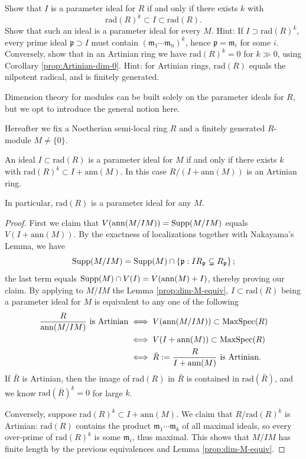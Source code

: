 \begin{exercise}
	Show that $I$ is a parameter ideal for $R$ if and only if there exists $k$ with
	\[ \text{rad}(R)^k \subset I \subset \text{rad}(R). \]
	Show that such an ideal is a parameter ideal for every $M$. Hint: If $I \supset \text{rad}(R)^k$, every prime ideal $\mathfrak{p} \supset I$ must contain $(\mathfrak{m}_1 \cdots \mathfrak{m}_n)^k$, hence $\mathfrak{p} = \mathfrak{m}_i$ for some $i$. Conversely, show that in an Artinian ring we have $\text{rad}(R)^k = 0$ for $k \gg 0$, using Corollary \ref{prop:Artinian-dim-0}. Hint: for Artinian rings, $\text{rad}(R)$ equals the nilpotent radical, and is finitely generated.
\end{exercise}

Dimension theory for modules can be built solely on the parameter ideals for $R$, but we opt to introduce the general notion here.

Hereafter we fix a Noetherian semi-local ring $R$ and a finitely generated $R$-module $M \neq \{0\}$.

\begin{lemma}\label{prop:para-ideal-characterization}
	An ideal $I \subset \text{rad}(R)$ is a parameter ideal for $M$ if and only if there exists $k$ with $\text{rad}(R)^k \subset I + \text{ann}(M)$. In this case $R/(I+\text{ann}(M))$ is an Artinian ring.
	
	In particular, $\text{rad}(R)$ is a parameter ideal for any $M$.
\end{lemma}
\begin{proof}
	First we claim that $V(\text{ann}(M/IM)) = \operatorname{Supp}(M/IM)$ equals $V(I+\text{ann}(M))$. By the exactness of localizations together with Nakayama's Lemma, we have
	\[ \operatorname{Supp}(M/IM) = \operatorname{Supp}(M) \cap \left\{ \mathfrak{p}: IR_{\mathfrak{p}} \subsetneq R_{\mathfrak{p}} \right\}; \]
	the last term equals $\operatorname{Supp}(M) \cap V(I) = V(\text{ann}(M)+I)$, thereby proving our claim. By applying to $M/IM$ the Lemma \ref{prop:dim-M-equiv}, $I \subset \text{rad}(R)$ being a parameter ideal for $M$ is equivalent to any one of the following
	\begin{align*}
		\frac{R}{\text{ann}(M/IM)} \text{ is Artinian} & \iff V(\text{ann}(M/IM)) \subset \operatorname{MaxSpec}(R) \\
		& \iff V(I+\text{ann}(M)) \subset \operatorname{MaxSpec}(R) \\
		& \iff \bar{R} := \frac{R}{I+\text{ann}(M)} \text{ is Artinian}.
	\end{align*}
	If $\bar{R}$ is Artinian, then the image of $\text{rad}(R)$ in $\bar{R}$ is contained in $\text{rad}(\bar{R})$, and we know $\text{rad}(\bar{R})^k = 0$ for large $k$.
	
	Conversely, suppose $\text{rad}(R)^k \subset I + \text{ann}(M)$. We claim that $R/\text{rad}(R)^k$ is Artinian: $\text{rad}(R)$ contains the product $\mathfrak{m}_1 \cdots \mathfrak{m}_k$ of all maximal ideals, so every over-prime of $\text{rad}(R)^k$ is some $\mathfrak{m}_i$, thus maximal. This shows that $M/IM$ has finite length by the previous equivalences and Lemma \ref{prop:dim-M-equiv}.
\end{proof}

